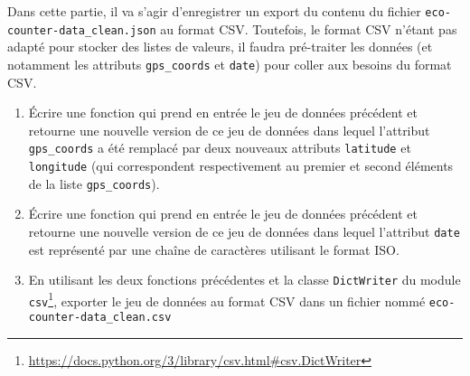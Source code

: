 \documentclass[11pt,a4paper]{article}
\begin{document}
Dans cette partie, il va s'agir d'enregistrer un export du contenu du fichier \verb+eco-counter-data_clean.json+ au format CSV.
Toutefois, le format CSV n'étant pas adapté pour stocker des listes de valeurs, il faudra pré-traiter les données (et notamment les attributs \verb+gps_coords+ et \verb+date+) pour coller aux besoins du format CSV.


\begin{enumerate}
    \item Écrire une fonction qui prend en entrée le jeu de données précédent et retourne une nouvelle version de ce jeu de données dans lequel l'attribut \verb+gps_coords+ a été remplacé par deux nouveaux attributs \verb+latitude+ et \verb+longitude+ (qui correspondent respectivement au premier et second éléments de la liste \verb+gps_coords+).
    
    \item Écrire une fonction qui prend en entrée le jeu de données précédent et retourne une nouvelle version de ce jeu de données dans lequel l'attribut \verb+date+ est représenté par une chaîne de caractères utilisant le format ISO.
    
    \item En utilisant les deux fonctions précédentes et la classe \verb+DictWriter+ du module \verb+csv+\footnote{\url{https://docs.python.org/3/library/csv.html\#csv.DictWriter}}, exporter le jeu de données au format CSV dans un fichier nommé \verb+eco-counter-data_clean.csv+
\end{enumerate}
\end{document}
